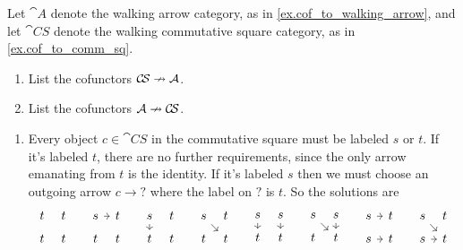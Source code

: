 \documentclass[Book-Poly]{subfiles}
\begin{document}
\begin{exercise}
Let $\cat{A}$ denote the walking arrow category, as in \cref{ex.cof_to_walking_arrow}, and let $\cat{C\!S}$ denote the walking commutative square category, as in \cref{ex.cof_to_comm_sq}.
\begin{enumerate}
    \item List the cofunctors $\mathcal{C\!S}\nrightarrow\mathcal{A}$.
    \item List the cofunctors $\mathcal{A}\nrightarrow\mathcal{C\!S}$.\qedhere
\end{enumerate}
\begin{solution}
\begin{enumerate}
    \item Every object $c\in \cat{C\!S}$ in the commutative square must be labeled $s$ or $t$. If it's labeled $t$, there are no further requirements, since the only arrow emanating from $t$ is the identity. If it's labeled $s$ then we must choose an outgoing arrow $c\to ?$ where the label on $?$ is $t$. So the solutions are
\[
    \begin{tikzcd}[sep=5pt]
    	t&t\\
			t&t
    \end{tikzcd}
	\quad\;
   \begin{tikzcd}[sep=5pt]
    	s\ar[r]&t\\
			t&t
    \end{tikzcd}
	\quad\;
   \begin{tikzcd}[sep=5pt]
    	s\ar[d]&t\\
			t&t
    \end{tikzcd}
	\quad\;
   \begin{tikzcd}[sep=5pt]
    	s\ar[dr]&t\\
			t&t
    \end{tikzcd}
	\quad\;
   \begin{tikzcd}[sep=5pt]
    	s\ar[d]&s\ar[d]\\
			t&t
    \end{tikzcd}
	\quad\;
   \begin{tikzcd}[sep=5pt]
    	s\ar[dr]&s\ar[d]\\
			t&t
    \end{tikzcd}
	\quad\;
   \begin{tikzcd}[sep=5pt]
    	s\ar[r]&t\\
			s\ar[r]&t
    \end{tikzcd}
	\quad\;
   \begin{tikzcd}[sep=5pt]
    	s\ar[dr]&t\\
			s\ar[r]&t
    \end{tikzcd}
\]
\end{enumerate}
\end{solution}
\end{exercise}
\end{document}
